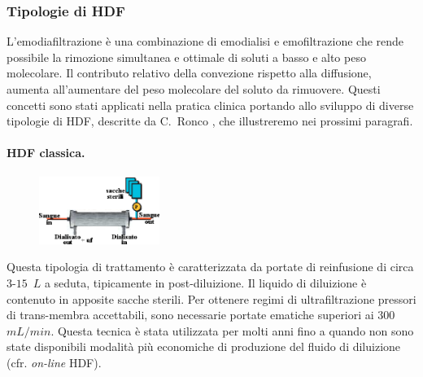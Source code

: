 \subsubsection{Tipologie di HDF}
L'emodiafiltrazione è una combinazione di emodialisi e emofiltrazione che rende possibile la rimozione simultanea e ottimale di soluti a basso e alto peso molecolare. Il contributo relativo della convezione rispetto alla diffusione, aumenta all'aumentare del peso molecolare del soluto da rimuovere. Questi concetti sono stati applicati nella pratica clinica portando allo sviluppo di diverse tipologie di HDF, descritte da C.~Ronco \cite{evolutionHDF}, che illustreremo nei prossimi paragrafi.

\paragraph{HDF classica.}
\begin{figure}
	\centering
	\vspace{-10pt}
		\includegraphics[width=0.35\textwidth]{immagini/classicHDF.eps}
		\vspace{-20pt}
\end{figure}
Questa tipologia di trattamento è caratterizzata da portate di reinfusione di circa $3$-$15$~$L$ a seduta, tipicamente in post-diluizione. Il liquido di diluizione è contenuto in apposite sacche sterili. Per ottenere regimi di ultrafiltrazione pressori di trans-membra accettabili, sono necessarie portate ematiche superiori ai $300$~$mL/min$. Questa tecnica è stata utilizzata per molti anni fino a quando non sono state disponibili modalità più economiche di produzione del fluido di diluizione (cfr. \textit{on-line} HDF).

